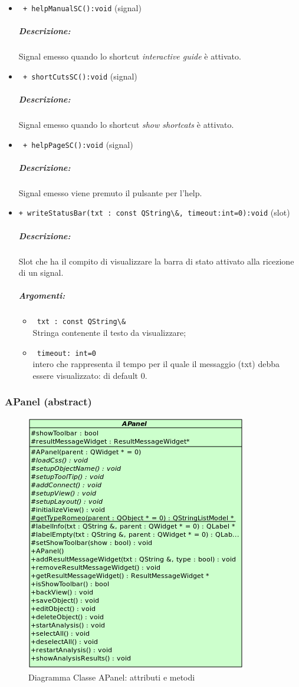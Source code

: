 \begin{itemize}
\item \color{blue}\verb! + helpManualSC():void! (signal)
\color{black} 
\subparagraph{Descrizione:} Signal\g{} emesso quando lo shortcut \textit{interactive guide} è attivato.

\item \color{blue}\verb! + shortCutsSC():void! (signal)
\color{black} 
\subparagraph{Descrizione:} Signal\g{} emesso quando lo shortcut \textit{show shortcats} è attivato.

\item \color{blue}\verb! + helpPageSC():void! (signal)
\color{black} 
\subparagraph{Descrizione:} Signal\g{} emesso viene premuto il pulsante per l'help.

\item \color{blue}\verb!+ writeStatusBar(txt : const QString\&, timeout:int=0):void! (slot)
\color{black}
\subparagraph{Descrizione:} Slot\g{} che ha il compito di visualizzare la barra di stato attivato alla ricezione di un signal\g{}.\\ 
\subparagraph{Argomenti:}
\begin{itemize}
\item \color{RoyalPurple} \verb! txt : const QString\& !\\ Stringa contenente il testo da visualizzare;
\item \color{RoyalPurple} \verb! timeout: int=0! \\ intero che rappresenta il tempo per il quale il messaggio (txt) debba essere visualizzato: di default 0.
\end{itemize}
\end{itemize}
\color{black}
\pagebreak
\subsubsection{APanel (abstract)}
\label{speAPanel}
\begin{figure}[!h]
\centering
			\includegraphics[width=0.65\linewidth]{./Content/Immagini/view/APanel.png}
			\caption{Diagramma Classe APanel: attributi e metodi}
			\label{cl_apanelV}
\end{figure}
